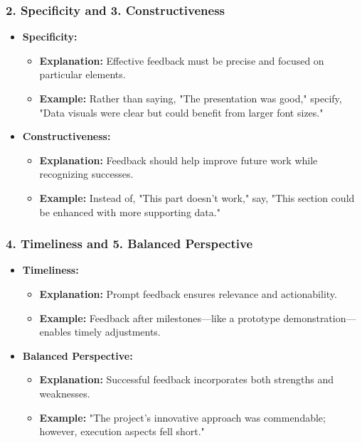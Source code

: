 \documentclass[aspectratio=169]{beamer}
\begin{document}
\begin{frame}[fragile]
    \frametitle{2. Specificity and 3. Constructiveness}
    \begin{itemize}
        \item \textbf{Specificity:}
        \begin{itemize}
            \item \textbf{Explanation:} Effective feedback must be precise and focused on particular elements.
            \item \textbf{Example:} Rather than saying, "The presentation was good," specify, "Data visuals were clear but could benefit from larger font sizes."
        \end{itemize}
        \vspace{0.5em}
        
        \item \textbf{Constructiveness:}
        \begin{itemize}
            \item \textbf{Explanation:} Feedback should help improve future work while recognizing successes.
            \item \textbf{Example:} Instead of, "This part doesn’t work," say, "This section could be enhanced with more supporting data."
        \end{itemize}
    \end{itemize}
\end{frame}

\begin{frame}[fragile]
    \frametitle{4. Timeliness and 5. Balanced Perspective}
    \begin{itemize}
        \item \textbf{Timeliness:}
        \begin{itemize}
            \item \textbf{Explanation:} Prompt feedback ensures relevance and actionability.
            \item \textbf{Example:} Feedback after milestones—like a prototype demonstration—enables timely adjustments.
        \end{itemize}
        \vspace{0.5em}
        
        \item \textbf{Balanced Perspective:}
        \begin{itemize}
            \item \textbf{Explanation:} Successful feedback incorporates both strengths and weaknesses.
            \item \textbf{Example:} "The project’s innovative approach was commendable; however, execution aspects fell short."
        \end{itemize}
    \end{itemize}
\end{frame}
\end{document}

